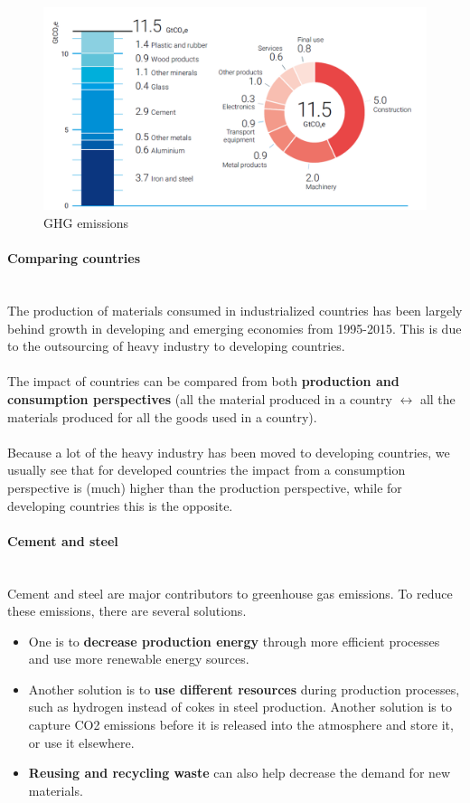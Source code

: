\documentclass[../summary.tex]{subfiles}
\begin{document}
\begin{figure}[H]
	\centering
	\includegraphics[width=0.9\linewidth]{../images/GHG_emissions}
	\caption{GHG emissions}
	\label{fig:ghgemissions}
\end{figure}

\paragraph{Comparing countries}
\ \\
The production of materials consumed in industrialized countries has been largely behind growth in developing and emerging economies from 1995-2015. This is due to the outsourcing of heavy industry to developing countries. \\
\\
The impact of countries can be compared from both \textbf{production and consumption perspectives} (all the material produced in a country $\leftrightarrow$ all the materials produced for all the goods used in a country). \\
\\
Because a lot of the heavy industry has been moved to developing countries, we usually see that for developed countries the impact from a consumption perspective is (much) higher than the production perspective, while for developing countries this is the opposite. 

\paragraph{Cement and steel}
\ \\
Cement and steel are major contributors to greenhouse gas emissions. To reduce these emissions, there are several solutions. 
\begin{itemize}
	\item One is to \textbf{decrease production energy} through more efficient processes and use more renewable energy sources. 
	\item Another solution is to \textbf{use different resources} during production processes, such as hydrogen instead of cokes in steel production. Another solution is to capture CO2 emissions before it is released into the atmosphere and store it, or use it elsewhere. 
	\item \textbf{Reusing and recycling waste} can also help decrease the demand for new materials.
\end{itemize}
\end{document}

